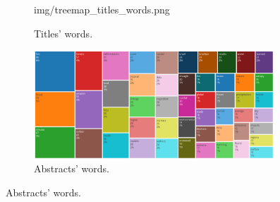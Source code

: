 \documentclass[aspectratio=169]{beamer}
\begin{document}
\begin{frame}
\begin{figure}
\begin{subfigure}{0.45\linewidth}
      {img/treemap_titles_words.png}
      \caption{Titles' words.}
      \label{fig:treemap_titles_words} 
    \end{subfigure}
    \begin{subfigure}{0.45\linewidth}
      \includegraphics[width=0.99\textwidth]
      {img/treemap_abstracts_words.png}
      \caption{Abstracts' words.}
      \label{fig:treemap_abstract_words} 
    \end{subfigure}
  \end{figure}
\end{frame}
\end{document}
